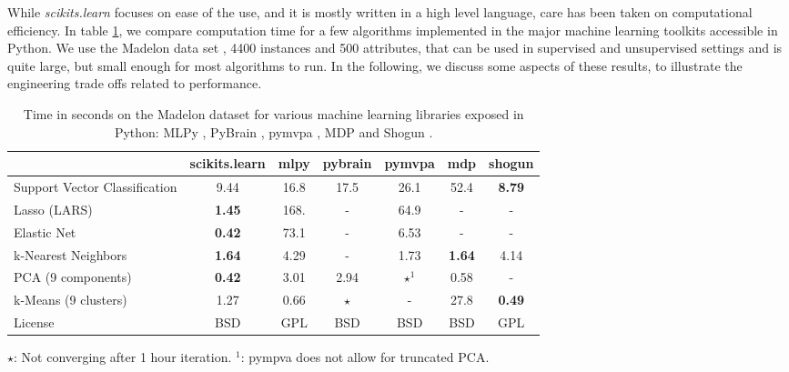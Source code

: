 \documentclass[twoside,11pt]{article}
\begin{document}

While \emph{scikits.learn} focuses on ease of the use, and it is
mostly written in a high level language, care has been taken on
computational efficiency. In table \ref{tab:comparisons}, we compare
computation time for a few algorithms implemented in the major machine
learning toolkits accessible in Python. We use the Madelon data
set \citep{Guyon2004}, 4400 instances and 500 attributes,
that can be used in supervised
and unsupervised settings and is quite large, but small enough for most
algorithms to run.
%
%
In the following, we discuss some aspects of these results, to illustrate
the engineering trade offs related to performance. 

\begin{table}[b]
\small
\hspace*{.03\linewidth}%
\begin{tabular}{l c c c c c c}
\hline\hline %
 & scikits.learn & mlpy & pybrain & pymvpa &  mdp & shogun \\ [0.5ex]
\hline
Support Vector Classification & 9.44 & 16.8 & 17.5 & 26.1 & 52.4 & {\bf 8.79} \\
Lasso (LARS) & {\bf 1.45} & 168.   & -       &  64.9     & -    & - \\
Elastic Net & {\bf 0.42} & 73.1 & -  &  6.53  & -  & - \\
k-Nearest Neighbors & {\bf 1.64} & 4.29 & - &  1.73 & {\bf 1.64} & 4.14 \\
PCA (9 components) & {\bf 0.42} & 3.01  & 2.94  & $\star^1$ & 0.58  & - \\
k-Means (9 clusters) & 1.27 & 0.66 & $\star$ & -  & 27.8 & {\bf 0.49} \\
License &  BSD & GPL & BSD  &  BSD  & BSD  & GPL \\
\hline
\end{tabular}

$\star$: Not converging after 1 hour iteration. \hfill $^1$: pympva does
not allow for truncated PCA. \\

\vspace*{-1.5ex}
\caption{\small
Time in seconds on the Madelon dataset for various machine learning libraries exposed in Python:
MLPy \citep{albanese2008}, PyBrain \citep{schaul2010}, pymvpa
\citep{hanke2009}, MDP \citep{zito2008} and Shogun
\citep{sonnenburg2010}. \label{tab:comparisons}
\vspace*{-1.5em}
}
\end{table}
\end{document}
